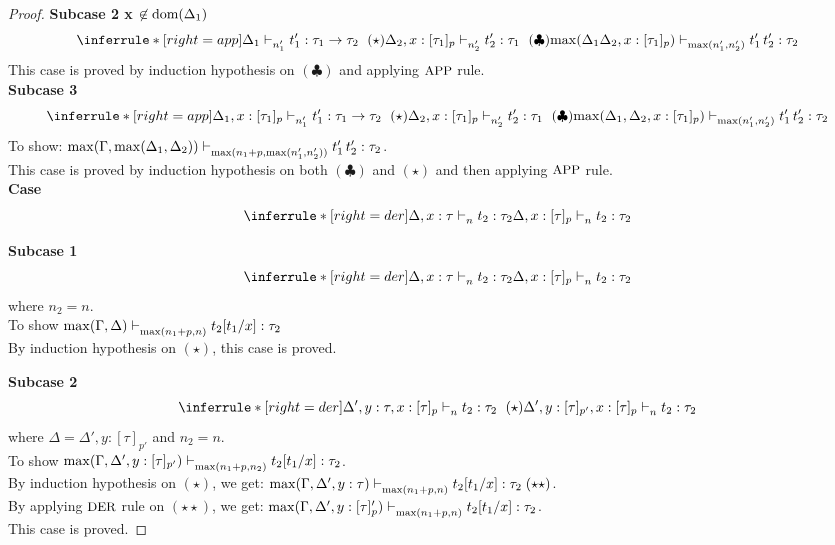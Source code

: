 \documentclass{article}
\begin{document}
\begin{proof}
\textbf{Subcase 2 x $\not \in \text{dom}(\Delta_1)$ } 
$$
  \inferrule*[ right = app ]
   {\Delta_1 \jtype{n_1'}{}{t_1'}{\tau_1 \rightarrow \tau_2} ~(\star) \\ \Delta_2, x: [\tau_1]_p \jtype{n_2'}{}{t_2'}{\tau_1} ~ (\clubsuit)}
   { \max(\Delta_1 \Delta_2, x: [\tau_1]_p) \jtype{\max(n_1',n_2')}{}{\app{t_1'}{t_2'}}{\tau_2} }
$$
This case is proved by induction hypothesis on $(\clubsuit)$ and applying $\mbox{\small{APP}}$ rule.\\

 \textbf{Subcase 3} 
$$
  \inferrule*[ right = app ]
   {\Delta_1, x: [\tau_1]_p \jtype{n_1'}{}{t_1'}{\tau_1 \rightarrow \tau_2}~(\star) \\ \Delta_2, x: [\tau_1]_p \jtype{n_2'}{}{t_2'}{\tau_1}~(\clubsuit)}
   { \max(\Delta_1, \Delta_2, x: [\tau_1]_p) \jtype{\max(n_1',n_2')}{}{\app{t_1'}{t_2'}}{\tau_2}  }
$$
To show: $\max(\Gamma, \max( \Delta_1, \Delta_2) ) \mathrel{\vdash_{\max(n_1 + p, \max(n_1',n_2'))}^{} {\mathrel{ {t_1'} \, {t_2'} }} : {\tau_2}} $. \\
This case is proved by induction hypothesis on both $(\clubsuit)$ and $(\star)$ and then applying $\mbox{\small{APP}}$ rule.\\


\noindent \textbf{Case} 
$$
   \inferrule*[ right = der ]
   {\Delta, x: \tau \jtype{n}{}{t_2}{ \tau_2 }  }
   { \Delta , x: [\tau]_p \jtype{n }{}{t_2 }{\tau_2 }  }
$$

\textbf{Subcase 1} 
$$
   \inferrule*[ right = der ]
   {\Delta, x: \tau \jtype{n}{}{t_2}{ \tau_2 }  }
   { \Delta , x: [\tau]_p \jtype{n}{}{t_2}{ \tau_2 }  }
$$
where  $n_2 = n$.\\
To show $\max(\Gamma, \Delta) \mathrel{\vdash_{\max(n_1 + p, n)}^{} {t_2[t_1/x]} : {\tau_2}}$\\
By induction hypothesis on $(\star)$, this case is proved.

\textbf{Subcase 2} 
$$
   \inferrule*[ right = der ]
   {\Delta', y: \tau, x : [\tau]_p \jtype{n}{}{t_2}{ \tau_2 } ~ (\star) }
   {\Delta' , y: [\tau]_{p'}, x : [\tau]_p \jtype{n }{}{t_2 }{\tau_2 } }
$$
where $\Delta =\Delta', y: [\tau]_{p'} $ and $n_2 = n$.\\
To show $\max(\Gamma, \Delta', y: [\tau]_{p'}) \mathrel{\vdash_{\max(n_1 + p, n_2)}^{} {t_2[t_1/x]} : {\tau_2}}$.\\
By induction hypothesis on $(\star)$, we get: 
$ \max(\Gamma, \Delta', y: \tau) \jtype{\max(n_1 + p, n)}{}{t_2[t_1/x]}{\tau_2} (\star \star)$.\\
By applying $\mbox{\small{DER}}$ rule on $(\star \star)$, we get:
$ \max(\Gamma, \Delta', y: [\tau]_p') \mathrel{\vdash_{\max(n_1 + p, n)}^{} {t_2[t_1/x]} : {\tau_2}}$.\\
This case is proved.



\end{proof}
\end{document}
